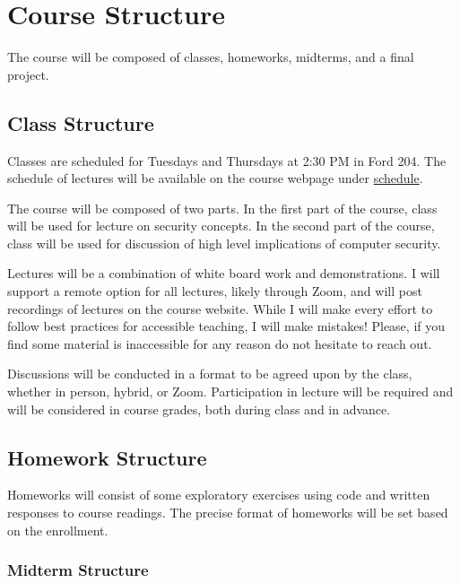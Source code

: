 \documentclass[11pt]{article}
\begin{document}

\section*{Course Structure}

The course will be composed of classes, homeworks, midterms, and a final project.

\subsection*{Class Structure}

Classes are scheduled for Tuesdays and Thursdays at 2:30 PM in Ford 204. The schedule
of lectures will be available on the course webpage under \href{https://cd-public.github.io/courses/sec/sched.html}{schedule}.

The course will be composed of two parts. In the first part of the course, class will be used for lecture on security concepts. In the second part of the course, class will be used for discussion of high level implications of computer security.

Lectures will be a combination of white board work and demonstrations. I will support a remote option
for all lectures, likely through Zoom, and will post recordings of lectures
on the course website. While I will make every effort to follow best practices for accessible teaching, I will make mistakes! Please, if you find some material is inaccessible for any reason
do not hesitate to reach out.

Discussions will be conducted in a format to be agreed upon by the class, whether in person, hybrid, or Zoom. Participation in lecture will be required and will be considered in course grades, both during class and in advance.

\subsection*{Homework Structure}

Homeworks will consist of some exploratory exercises using code and written responses to course readings. The precise format of homeworks will be set based on the enrollment.

\subsubsection*{Midterm Structure}
\end{document}
